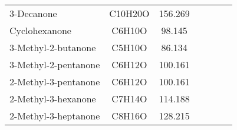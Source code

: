 \begin{landscape}
\begin{longtable}[c]{@{}lcccccc@{}}
3-Decanone           & C10H20O          & 156.269             &                              &                               &                          &                  \\
Cyclohexanone        & C6H10O           & 98.145              &                              &                               &                          &                  \\
3-Methyl-2-butanone  & C5H10O           & 86.134              &                              &                               &                          &                  \\
3-Methyl-2-pentanone & C6H12O           & 100.161             &                              &                               &                          &                  \\
2-Methyl-3-pentanone & C6H12O           & 100.161             &                              &                               &                          &                  \\
2-Methyl-3-hexanone  & C7H14O           & 114.188             &                              &                               &                          &                  \\
2-Methyl-3-heptanone & C8H16O           & 128.215             &                              &                               &                          &                  \\* \bottomrule
\end{longtable}
\end{landscape}



